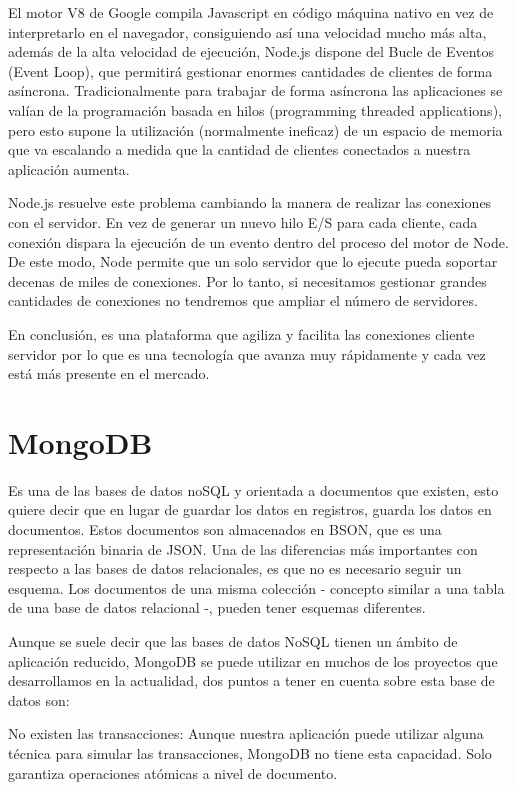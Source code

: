 \documentclass[a4paper, 12pt]{book}
\begin{document}
	El motor V8 de Google compila Javascript en código máquina nativo en vez de interpretarlo en el navegador, consiguiendo así una velocidad mucho más alta, además de la alta velocidad de ejecución, Node.js dispone del Bucle de Eventos (Event Loop), que permitirá gestionar enormes cantidades de clientes de forma asíncrona. Tradicionalmente para trabajar de forma asíncrona las aplicaciones se valían de la programación basada en hilos (programming threaded applications), pero esto supone la utilización (normalmente ineficaz) de un espacio de memoria que va escalando a medida que la cantidad de clientes conectados a nuestra aplicación aumenta.
	
	Node.js resuelve este problema cambiando la manera de realizar las conexiones con el servidor. En vez de generar un nuevo hilo E/S para cada cliente, cada conexión dispara la ejecución de un evento dentro del proceso del motor de Node. De este modo, Node permite que un solo servidor que lo ejecute pueda soportar decenas de miles de conexiones. Por lo tanto, si necesitamos gestionar grandes cantidades de conexiones no tendremos que ampliar el número de servidores.

	En conclusión, es una plataforma que agiliza y facilita las conexiones cliente servidor por lo que es una tecnología que avanza muy rápidamente y cada vez está más presente en el mercado.

\section{MongoDB} 
\label{sec:MongoDB}

Es una de las bases de datos noSQL y orientada a documentos que existen, esto quiere decir que en lugar de guardar los datos en registros, guarda los datos en documentos. Estos documentos son almacenados en BSON, que es una representación binaria de JSON. Una de las diferencias más importantes con respecto a las bases de datos relacionales, es que no es necesario seguir un esquema. Los documentos de una misma colección - concepto similar a una tabla de una base de datos relacional -, pueden tener esquemas diferentes.

	Aunque se suele decir que las bases de datos NoSQL tienen un ámbito de aplicación reducido, MongoDB se puede utilizar en muchos de los proyectos que desarrollamos en la actualidad, dos puntos a tener en cuenta sobre esta base de datos son:
	
	No existen las transacciones: Aunque nuestra aplicación puede utilizar alguna técnica para simular las transacciones, MongoDB no tiene esta capacidad. Solo garantiza operaciones atómicas a nivel de documento.
\end{document}
